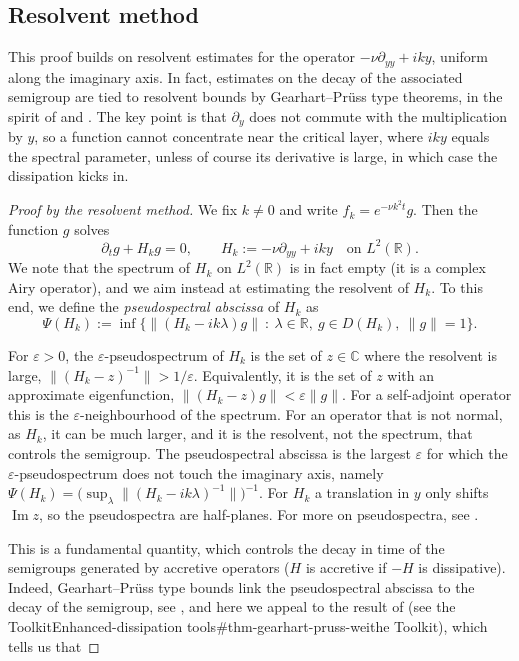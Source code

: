 \documentclass[11pt]{article}
\makeatletter
\theoremstyle{definition}
\theoremstyle{remark}
\newenvironment{note}[1][Note]{\begin{tcolorbox}[ed@note]\noindent{\itshape#1\@addpunct{.}}\enspace\ignorespaces}{\end{tcolorbox}}
\newcommand{\wikilink}[2]{\ifx\relax#2\relax#1\else#2\fi}
\makeatother
\begin{document}
\subsection{Resolvent method}
This proof builds on resolvent estimates for the operator $-\nu\partial_{yy}+iky$, uniform along the imaginary axis. In fact, estimates on the decay of the associated semigroup are tied to resolvent bounds by Gearhart–Prüss type theorems, in the spirit of \citet{HelfferSjostrand2010} and \citet{Wei2021Resolvent}. The key point is that $\partial_y$ does not commute with the multiplication by $y$, so a function cannot concentrate near the critical layer, where $iky$ equals the spectral parameter, unless of course its derivative is large, in which case the dissipation kicks in.
\begin{proof}[Proof by the resolvent method]\label{proof-couette-resolvent}
We fix $k\neq0$ and write $f_k=e^{-\nu k^2t}g$. Then the function $g$ solves
\[\partial_tg+H_kg=0,\qquad H_k:=-\nu\partial_{yy}+iky\quad\text{on }L^2(\mathbb{R}).\]
We note that the spectrum of $H_k$ on $L^2(\mathbb{R})$ is in fact empty (it is a complex Airy operator), and we aim instead at estimating the resolvent of $H_k$. To this end, we define the \emph{pseudospectral abscissa} of $H_k$ as
\[\Psi(H_k):=\inf\big\{\|(H_k-ik\lambda)g\|\ :\ \lambda\in\mathbb{R},\ g\in D(H_k),\ \|g\|=1\big\}.\]
\begin{note}[What the pseudospectral abscissa measures]
For $\varepsilon>0$, the $\varepsilon$-pseudospectrum of $H_k$ is the set of $z\in\mathbb{C}$ where the resolvent is large, $\|(H_k-z)^{-1}\|>1/\varepsilon$. Equivalently, it is the set of $z$ with an approximate eigenfunction, $\|(H_k-z)g\|<\varepsilon\|g\|$. For a self-adjoint operator this is the $\varepsilon$-neighbourhood of the spectrum. For an operator that is not normal, as $H_k$, it can be much larger, and it is the resolvent, not the spectrum, that controls the semigroup. The pseudospectral abscissa is the largest $\varepsilon$ for which the $\varepsilon$-pseudospectrum does not touch the imaginary axis, namely $\Psi(H_k)=\big(\sup_{\lambda}\|(H_k-ik\lambda)^{-1}\|\big)^{-1}$. For $H_k$ a translation in $y$ only shifts $\operatorname{Im}z$, so the pseudospectra are half-planes. For more on pseudospectra, see \citet{TrefethenEmbree2005}.
\end{note}
This is a fundamental quantity, which controls the decay in time of the semigroups generated by accretive operators ($H$ is accretive if $-H$ is dissipative). Indeed, Gearhart–Prüss type bounds link the pseudospectral abscissa to the decay of the semigroup, see \citet{HelfferSjostrand2010}, and here we appeal to the result of \citet{Wei2021Resolvent} (see \wikilink{Enhanced-dissipation tools\#thm-gearhart-pruss-wei}{the Toolkit}), which tells us that

\end{proof}
\end{document}
